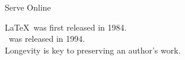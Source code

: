      \begin{block}{\rule{0pt}{1in}Serve Online}
        \begin{figure}[htb]
          \centering
        \end{figure}
      \end{block}

      \begin{block}{\rule{0pt}{1in}\raisebox{.2\height}{Fight Bit Rot}}
\footnotesize 
\LaTeX\ was first released in 1984.\\
\LaTeXe\ was released in 1994. \\
Longevity is key to preserving an author's work.
      \end{block}

